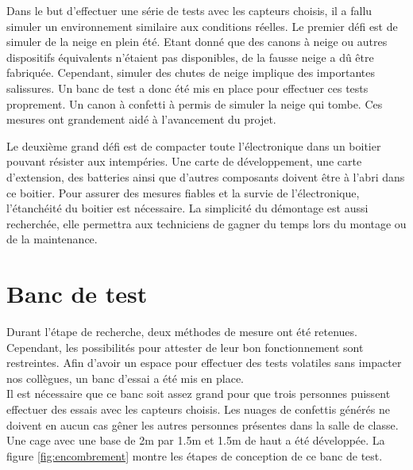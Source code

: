 Dans le but d'effectuer une série de tests avec les capteurs choisis, il a fallu simuler un environnement 
similaire aux conditions réelles. Le premier défi est de simuler de la neige en plein été. Etant donné 
que des canons à neige ou autres dispositifs équivalents n’étaient pas disponibles, de la fausse neige 
a dû être fabriquée. Cependant, simuler des chutes de neige implique des importantes salissures. Un 
banc de test a donc été mis en place pour effectuer ces tests proprement. Un canon à confetti à permis
de simuler la neige qui tombe. Ces mesures ont grandement aidé à l’avancement du projet.\par 
Le deuxième grand défi est de compacter toute l'électronique dans un boitier pouvant résister aux 
intempéries. Une carte de développement, une carte d'extension, des batteries ainsi que d’autres composants 
doivent être à l’abri dans ce boitier. Pour assurer des mesures fiables et la survie de l’électronique, 
l’étanchéité du boitier est nécessaire. La simplicité du démontage est aussi recherchée, elle permettra 
aux techniciens de gagner du temps lors du montage ou de la maintenance.

\section{Banc de test}
\label{sec:banc}

Durant l’étape de recherche, deux méthodes de mesure ont été retenues. Cependant, les possibilités pour 
attester de leur bon fonctionnement sont restreintes. Afin d’avoir un espace pour effectuer des tests 
volatiles sans impacter nos collègues, un banc d’essai a été mis en place. \\
Il est nécessaire que ce banc soit assez grand pour que trois personnes puissent effectuer des 
essais avec les capteurs choisis. Les nuages de confettis générés ne doivent en aucun cas gêner les 
autres personnes présentes dans la salle de classe. Une cage avec une base de 2m par 1.5m et 1.5m de 
haut a été développée. La figure \ref{fig:encombrement} montre les étapes de conception de ce banc 
de test.

